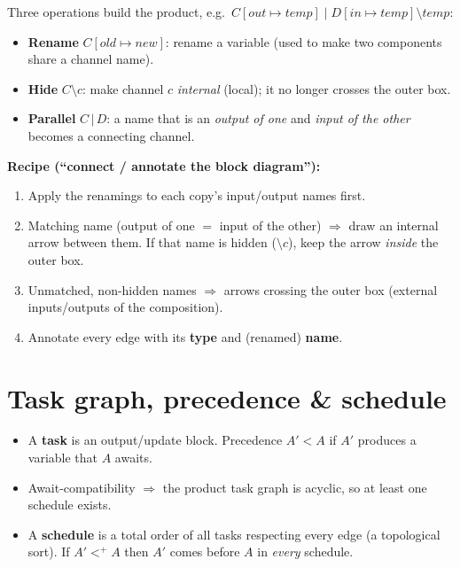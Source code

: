 Three operations build the product, e.g.\ $C[\mathit{out}\mapsto\mathit{temp}]\;|\;
D[\mathit{in}\mapsto\mathit{temp}]\setminus\mathit{temp}$:
\begin{itemize}
  \item \textbf{Rename} $C[\mathit{old}\mapsto\mathit{new}]$: rename a variable
        (used to make two components share a channel name).
  \item \textbf{Hide} $C\setminus c$: make channel $c$ \emph{internal} (local);
        it no longer crosses the outer box.
  \item \textbf{Parallel} $C\,|\,D$: a name that is an \emph{output of one} and
        \emph{input of the other} becomes a connecting channel.
\end{itemize}

\textbf{Recipe (``connect / annotate the block diagram''):}
\begin{enumerate}
  \item Apply the renamings to each copy's input/output names first.
  \item Matching name (output of one $=$ input of the other) $\Rightarrow$ draw an
        internal arrow between them. If that name is hidden ($\setminus c$), keep the
        arrow \emph{inside} the outer box.
  \item Unmatched, non-hidden names $\Rightarrow$ arrows crossing the outer box
        (external inputs/outputs of the composition).
  \item Annotate every edge with its \textbf{type} and (renamed) \textbf{name}.
\end{enumerate}

\section{Task graph, precedence \& schedule}

\begin{itemize}
  \item A \textbf{task} is an output/update block. Precedence $A'<A$ if $A'$
        produces a variable that $A$ awaits.
  \item Await-compatibility $\Rightarrow$ the product task graph is acyclic,
        so at least one schedule exists.
  \item A \textbf{schedule} is a total order of all tasks respecting every edge
        (a topological sort). If $A'<^{+}A$ then $A'$ comes before $A$ in
        \emph{every} schedule.
\end{itemize}

